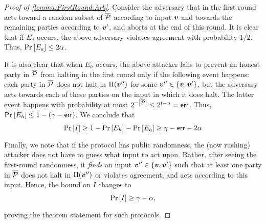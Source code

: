 \begin{proof}[Proof of \cref{lemma:FirstRound:Arb}]
Consider the adversary that in the first round acts toward a random subset of ${\overline{\mathcal{P}}}$ according to input ${ \boldsymbol{v}}$ and towards the remaining parties according to ${ \boldsymbol{v}}'$, and aborts at the end of this round. It is clear that if $E_a$ occurs, the above adversary violates agreement with probability $1/2$. Thus, $\Pr_{}\left[E_a\right] \le 2\alpha$.

It is also clear that when $E_h$ occurs, the above attacker fails to prevent an honest party in ${\overline{\mathcal{P}}}$ from halting in the first round only if the following event happens: each party in ${\overline{\mathcal{P}}} $ does not halt in $\Pi({ \boldsymbol{v}}'')$ for some ${ \boldsymbol{v}}'' \in \left\{{ \boldsymbol{v}},{ \boldsymbol{v}}'\right\}$, but the adversary acts towards each of these parties on the input in which it does halt. The latter event happens with probability at most $2^{-\left|{\overline{\mathcal{P}}}\right|} \le 2^{t-n} = \mathsf{err}$. Thus, $\Pr_{}\left[E_h\right] \le 1 - (\gamma - \mathsf{err})$. We conclude that
\begin{align}
	\Pr_{}\left[I\right] \ge 1 - \Pr_{}\left[E_h\right] - \Pr_{}\left[E_a\right] \ge \gamma - \mathsf{err} - 2\alpha
\end{align}
Finally, we note that if the protocol has public randomness, the (now rushing) attacker does not have to guess what input to act upon.
Rather, after seeing the first-round randomness, it \emph{finds} an input ${ \boldsymbol{v}}'' \in\left\{{ \boldsymbol{v}},{ \boldsymbol{v}}'\right\}$ such that at least one party in ${\overline{\mathcal{P}}}$ does not halt in $\Pi({ \boldsymbol{v}}'')$ or violates agreement, and acts according to this input. Hence, the bound on $I$ changes to
\begin{align*}
\Pr_{}\left[I\right] \ge \gamma - \alpha,
\end{align*}
proving the theorem statement for such protocols.
\end{proof}
